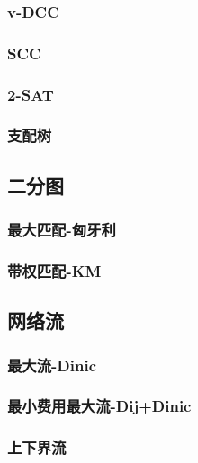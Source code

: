 \documentclass[twocolumn,a4]{article}
\newcommand{\addcpp}[1]{}
\begin{document}
		\subsubsection{v-DCC}
		\subsubsection{SCC}
		\subsubsection{2-SAT}
		\subsubsection{支配树}
	\subsection{二分图}
		\subsubsection{最大匹配-匈牙利}		
		\subsubsection{带权匹配-KM}
	\subsection{网络流}
		\subsubsection{最大流-Dinic}
		\subsubsection{最小费用最大流-Dij+Dinic}
		\subsubsection{上下界流}
\end{document}
